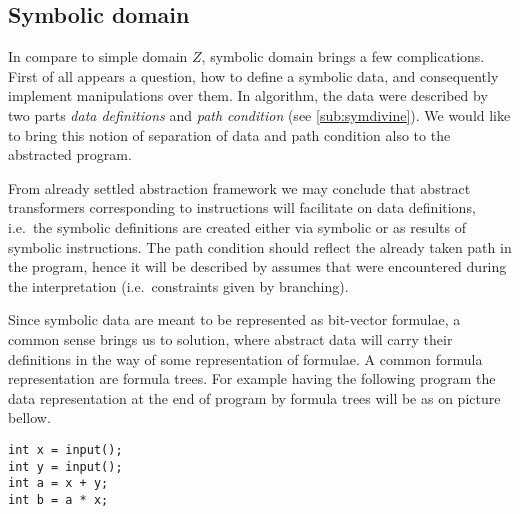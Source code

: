 \subsection{Symbolic domain}\label{sec:sym}

In compare to simple domain $Z$, symbolic domain brings a few complications.
First of all appears a question, how to define a symbolic data, and consequently
implement manipulations over them. In \SymDIVINE algorithm, the data were
described by two parts \emph{data definitions} and \emph{path condition} (see
\autoref{sub:symdivine}). We would like to bring this notion of separation of data
and path condition also to the abstracted program.

From already settled abstraction framework we may conclude that abstract
transformers corresponding to \LLVM instructions will facilitate on data
definitions, i.e.~the symbolic definitions are created either via symbolic
 or as results of symbolic instructions. The path condition should
reflect the already taken path in the program, hence it will be described by
assumes that were encountered during the interpretation (i.e.~constraints given
by branching).

Since symbolic data are meant to be represented as bit-vector formulae,
a common sense brings us to solution, where abstract data will carry their
definitions in the way of some representation of formulae. A common formula
representation are formula trees. For example having the following program the
data representation at the end of program by formula trees will be as on picture bellow.
\begin{verbatim}
int x = input();
int y = input();
int a = x + y;
int b = a * x;
\end{verbatim}

\begin{center}
\begin{minipage}{.4\textwidth}
\end{minipage}
\begin{minipage}{.4\textwidth}
\end{minipage}
\end{center}

